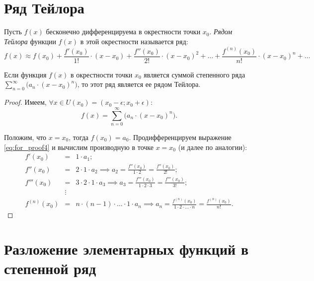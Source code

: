 

\section{Ряд Тейлора}

\begin{definition}
    Пусть $f(x)$ бесконечно дифференцируема в окрестности точки $x_0$. \emph{Рядом Тейлора} функции $f(x)$ в этой окрестности называется ряд:
    \[
        f(x)\approx f(x_0) + \frac{f'(x_0)}{1!}\cdot (x-x_0) + \frac{f''(x_0)}{2!}\cdot (x - x_0)^2 + \ldots + \frac{f^{(n)}(x_0)}{n!}\cdot (x-x_0)^n + \ldots
    \]
\end{definition}

\begin{statement}
    Если функция $f(x)$ в окрестности точки $x_0$ является суммой степенного ряда $\sum_{n=0}^{\infty}\big(a_n \cdot (x-x_0)^n\big)$, то этот ряд является ее рядом Тейлора.
\end{statement}

\begin{proof}
    Имеем, $\forall x \in U(x_0) = (x_0 - \epsilon;x_0 + \epsilon)$:
    \begin{equation}\label{eq:for_proof4}
        f(x) = \sum_{n=0}^{\infty}\big(a_n\cdot (x-x_0)^n\big).
    \end{equation}

    Положим, что $x=x_0$, тогда $f(x_0) = a_0$. Продифференцируем выражение \ref{eq:for_proof4} и вычислим производную в точке $x=x_0$ (и далее по аналогии):
    \begin{eqnarray*}
        f'(x_0) &=& 1 \cdot a_1; \\
        f''(x_0) &=& 2 \cdot 1 \cdot a_2 \implies a_2 = \frac{f''(x_0)}{1 \cdot 2} = \frac{f''(x_0)}{2!}; \\
        f'''(x_0) &=& 3 \cdot 2 \cdot 1 \cdot a_3 \implies a_3 = \frac{f'''(x_0)}{1 \cdot 2 \cdot 3} = \frac{f'''(x_0)}{3!}; \\
        &\vdots& \\
        f^{(n)}(x_0) &=& n \cdot (n-1) \cdot \ldots \cdot 1 \cdot a_n \implies a_n = \frac{f^{(n)}(x_0)}{1 \cdot 2 \cdot \ldots \cdot n} = \frac{f^{(n)}(x_0)}{n!}.
    \end{eqnarray*}
\end{proof}

\newpage

\section{Разложение элементарных функций в степенной ряд}

